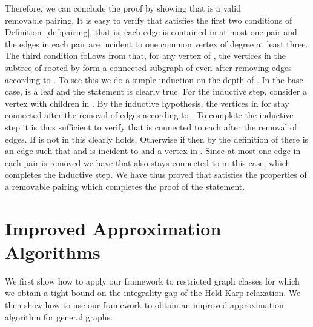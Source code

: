 \documentclass[letterpaper,11pt]{article}
\newenvironment{proof}{\begin{trivlist}
\item[\hskip\labelsep {\bf Proof}.]}{\QED \end{trivlist}}
\newcommand{\QED}{\hfill }
\newcommand{\MS}{\ensuremath{\mbox{removable pairing}}\xspace}
\begin{document}
\begin{proof}
  Therefore, we can conclude the proof by showing that  is a
  valid \MS.  It is easy to verify that  satisfies the first
  two conditions of Definition~\ref{def:pairing}, that is, each edge
  is contained in at most one pair and the edges in each pair are
  incident to one common vertex of degree at least three. The third
  condition follows from that, for any vertex  of , the
  vertices in the subtree  of  rooted by  form a connected
  subgraph of  even after removing edges according to . To
  see this we do a simple induction on the depth of . In the base
  case,  is a leaf and the statement is clearly true. For the
  inductive step, consider a vertex  with  children  in . By the inductive hypothesis, the
  vertices in  for  stay connected after
  the removal of edges according to . To complete the inductive
  step it is thus sufficient to verify that  is connected to each
   after the removal of edges. If  is not in 
  this clearly holds. Otherwise if  then by
  the definition of  there is an edge  such that  and  is incident to  and a vertex in . Since
  at most one edge in each pair is removed we have that  also stays
  connected to  in this case, which completes the inductive
  step. We have thus proved that  satisfies the properties of a
  \MS which completes the proof of the statement.

\end{proof}

\section{Improved Approximation Algorithms}
\label{sec:algorithms}
We first show how to apply our framework to restricted graph classes
for which we obtain a tight bound on the integrality gap of the
Held-Karp relaxation. We then show how to use our framework to obtain
an improved approximation algorithm for general graphs.
\end{document}
